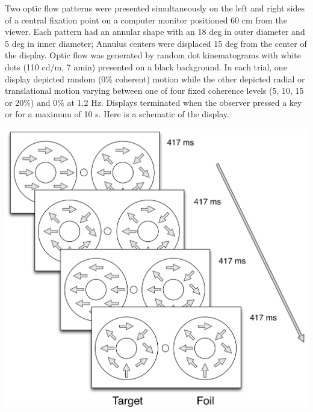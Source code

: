 \documentclass[landscape,final,a0paper,fontscale=0.285]{baposter}
\begin{document}
\begin{poster}

    {
      Two optic flow patterns were presented simultaneously on the left and right sides of a central fixation point on a computer monitor positioned 60 cm from the viewer.
      Each pattern had an annular shape with an 18 deg in outer diameter and 5 deg in inner diameter; Annulus centers were displaced 15 deg from the center of the display.
      Optic flow was generated by random dot kinematograms with white dots (110 cd/m, 7 amin) presented on a black background.
      In each trial, one display depicted random (0\% coherent) motion while the other depicted radial or translational motion varying between one of four fixed coherence levels (5, 10, 15 or 20\%) and 0\% at 1.2 Hz.
      Displays terminated when the observer pressed a key or for a maximum of 10 s.
      Here is a schematic of the display.

      \vspace{3em}
      \includegraphics[scale=0.30]{img/optic-flow-psychophysics-display.png}
      \vspace{4em}
    }



\end{poster}
\end{document}
